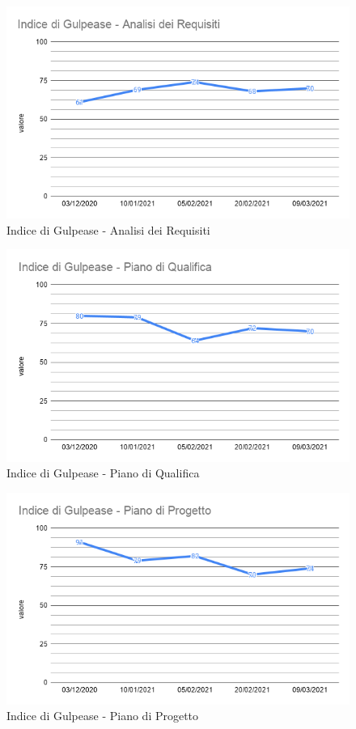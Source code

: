 \begin{figure}[H]
    \centering
    \includegraphics[width=13 cm]{source/sections/images/IdG_AR.png}
    \caption{Indice di Gulpease - Analisi dei Requisiti}
\end{figure}
\begin{figure}[H]
    \centering
    \includegraphics[width=13 cm]{source/sections/images/IdG_PdQ.png}
    \caption{Indice di Gulpease - Piano di Qualifica}
\end{figure}
\begin{figure}[H]
    \centering
    \includegraphics[width=13 cm]{source/sections/images/IdG_PdP.png}
    \caption{Indice di Gulpease - Piano di Progetto}
\end{figure}

